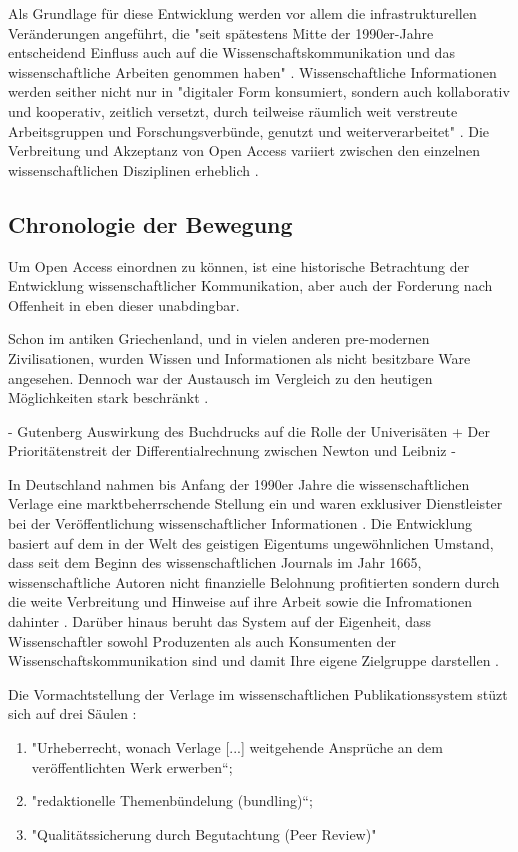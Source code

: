 Als Grundlage für diese Entwicklung werden vor allem die infrastrukturellen Veränderungen angeführt, die "seit spätestens Mitte der 1990er-Jahre entscheidend Einfluss auch auf die Wissenschaftskommunikation und das wissenschaftliche Arbeiten genommen haben" \cite{schulze_2013_open}. Wissenschaftliche Informationen werden seither nicht nur in "digitaler Form konsumiert, sondern auch kollaborativ und kooperativ, zeitlich versetzt, durch teilweise räumlich weit verstreute Arbeitsgruppen und Forschungsverbünde, genutzt und weiterverarbeitet" \cite{schulze_2013_open}. Die Verbreitung und Akzeptanz von Open Access variiert zwischen den einzelnen wissenschaftlichen Disziplinen erheblich \cite{cite:21a} .

\subsection{Chronologie der Bewegung}
Um Open Access einordnen zu können, ist eine historische Betrachtung der Entwicklung wissenschaftlicher Kommunikation, aber auch der Forderung nach Offenheit in eben dieser unabdingbar. 

Schon im antiken Griechenland, und in vielen anderen pre-modernen Zivilisationen, wurden Wissen und Informationen als nicht besitzbare Ware angesehen\cite{cite:18}. Dennoch war der Austausch im Vergleich zu den heutigen Möglichkeiten stark beschränkt \cite{cite:17c}.

- Gutenberg Auswirkung des Buchdrucks auf die Rolle der Univerisäten + Der Prioritätenstreit der Differentialrechnung zwischen Newton und Leibniz -

In Deutschland nahmen bis Anfang der 1990er Jahre die wissenschaftlichen Verlage eine marktbeherrschende Stellung ein und waren exklusiver Dienstleister bei der Veröffentlichung wissenschaftlicher Informationen \cite{schloegl_2005} \cite{offhaus_2012_institutionelle_repos}. Die Entwicklung basiert auf dem in der Welt des geistigen Eigentums ungewöhnlichen Umstand, dass seit dem Beginn des wissenschaftlichen Journals im Jahr 1665, wissenschaftliche Autoren nicht finanzielle Belohnung profitierten sondern durch die weite Verbreitung und Hinweise auf ihre Arbeit sowie die Infromationen dahinter \cite{albert_2006_open_implications}. Darüber hinaus beruht das System auf der Eigenheit, dass Wissenschaftler sowohl Produzenten als auch Konsumenten der Wissenschaftskommunikation sind und damit Ihre eigene Zielgruppe darstellen \cite{Hess_2006}.

Die Vormachtstellung der Verlage im wissenschaftlichen Publikationssystem stüzt sich auf drei Säulen \cite{offhaus_2012_institutionelle_repos} \cite{bargheer_2006_open}: 
\begin{enumerate}
\item "Urheberrecht, wonach Verlage [...] weitgehende Ansprüche an dem veröffentlichten Werk erwerben“;
\item "redaktionelle Themenbündelung (bundling)“;
\item "Qualitätssicherung durch Begutachtung (Peer Review)"
\end{enumerate}

